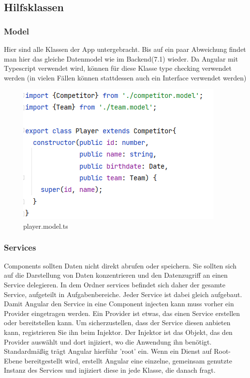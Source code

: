 \subsection{Hilfsklassen}
\subsubsection{Model}
Hier sind alle Klassen der App untergebracht. Bis auf ein paar Abweichung findet man hier das gleiche Datenmodel wie im Backend(7.1) wieder.
Da Angular mit Typescript verwendet wird, können für diese Klasse type checking verwendet werden (in vielen Fällen können stattdessen auch ein Interface verwendet werden)

\begin{figure}[H]
    \includegraphics[scale=0.7]{pics/frontend/player_model.png}
    \caption{player.model.ts}
\end{figure}

\subsubsection{Services}
Components sollten Daten nicht direkt abrufen oder speichern. Sie sollten sich auf die Darstellung von Daten konzentrieren und den Datenzugriff an einen Service delegieren. In dem Ordner services befindet sich daher der gesamte Service, aufgeteilt in Aufgabenbereiche.
Jeder Service ist dabei gleich aufgebaut. Damit Angular den Service in eine Component injecten kann muss vorher ein Provider eingetragen werden. Ein Provider ist etwas, das einen Service erstellen oder bereitstellen kann.
Um sicherzustellen, dass der Service diesen anbieten kann, registrieren Sie ihn beim Injektor. Der Injektor ist das Objekt, das den Provider auswählt und dort injiziert, wo die Anwendung ihn benötigt.
Standardmäßig trägt Angular hierführ 'root' ein. Wenn ein Dienst auf Root-Ebene bereitgestellt wird, erstellt Angular eine einzelne, gemeinsam genutzte Instanz des Services und injiziert diese in jede Klasse, die danach fragt. \cite{implementation-angular-3}

